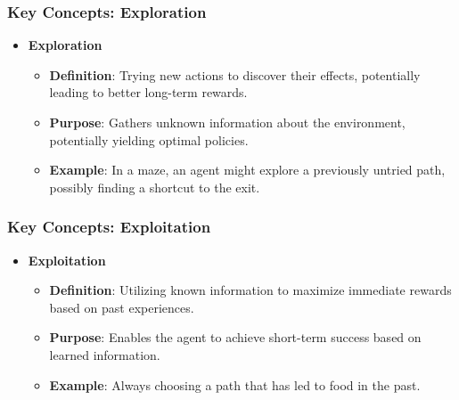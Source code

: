\documentclass[aspectratio=169]{beamer}
\begin{document}
\begin{frame}[fragile]
    \frametitle{Key Concepts: Exploration}
    \begin{itemize}
        \item \textbf{Exploration}
        \begin{itemize}
            \item \textbf{Definition}: Trying new actions to discover their effects, potentially leading to better long-term rewards.
            \item \textbf{Purpose}: Gathers unknown information about the environment, potentially yielding optimal policies.
            \item \textbf{Example}: In a maze, an agent might explore a previously untried path, possibly finding a shortcut to the exit.
        \end{itemize}
    \end{itemize}
\end{frame}

\begin{frame}[fragile]
    \frametitle{Key Concepts: Exploitation}
    \begin{itemize}
        \item \textbf{Exploitation}
        \begin{itemize}
            \item \textbf{Definition}: Utilizing known information to maximize immediate rewards based on past experiences.
            \item \textbf{Purpose}: Enables the agent to achieve short-term success based on learned information.
            \item \textbf{Example}: Always choosing a path that has led to food in the past.
        \end{itemize}
    \end{itemize}
\end{frame}
\end{document}
